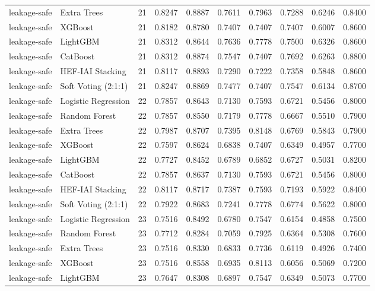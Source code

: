 \begin{tabular}{llrrrrrrrr}
leakage-safe & Extra Trees & 21 & 0.8247 & 0.8887 & 0.7611 & 0.7963 & 0.7288 & 0.6246 & 0.8400 \\
leakage-safe & XGBoost & 21 & 0.8182 & 0.8780 & 0.7407 & 0.7407 & 0.7407 & 0.6007 & 0.8600 \\
leakage-safe & LightGBM & 21 & 0.8312 & 0.8644 & 0.7636 & 0.7778 & 0.7500 & 0.6326 & 0.8600 \\
leakage-safe & CatBoost & 21 & 0.8312 & 0.8874 & 0.7547 & 0.7407 & 0.7692 & 0.6263 & 0.8800 \\
leakage-safe & HEF-IAI Stacking & 21 & 0.8117 & 0.8893 & 0.7290 & 0.7222 & 0.7358 & 0.5848 & 0.8600 \\
leakage-safe & Soft Voting (2:1:1) & 21 & 0.8247 & 0.8869 & 0.7477 & 0.7407 & 0.7547 & 0.6134 & 0.8700 \\
leakage-safe & Logistic Regression & 22 & 0.7857 & 0.8643 & 0.7130 & 0.7593 & 0.6721 & 0.5456 & 0.8000 \\
leakage-safe & Random Forest & 22 & 0.7857 & 0.8550 & 0.7179 & 0.7778 & 0.6667 & 0.5510 & 0.7900 \\
leakage-safe & Extra Trees & 22 & 0.7987 & 0.8707 & 0.7395 & 0.8148 & 0.6769 & 0.5843 & 0.7900 \\
leakage-safe & XGBoost & 22 & 0.7597 & 0.8624 & 0.6838 & 0.7407 & 0.6349 & 0.4957 & 0.7700 \\
leakage-safe & LightGBM & 22 & 0.7727 & 0.8452 & 0.6789 & 0.6852 & 0.6727 & 0.5031 & 0.8200 \\
leakage-safe & CatBoost & 22 & 0.7857 & 0.8637 & 0.7130 & 0.7593 & 0.6721 & 0.5456 & 0.8000 \\
leakage-safe & HEF-IAI Stacking & 22 & 0.8117 & 0.8717 & 0.7387 & 0.7593 & 0.7193 & 0.5922 & 0.8400 \\
leakage-safe & Soft Voting (2:1:1) & 22 & 0.7922 & 0.8683 & 0.7241 & 0.7778 & 0.6774 & 0.5622 & 0.8000 \\
leakage-safe & Logistic Regression & 23 & 0.7516 & 0.8492 & 0.6780 & 0.7547 & 0.6154 & 0.4858 & 0.7500 \\
leakage-safe & Random Forest & 23 & 0.7712 & 0.8284 & 0.7059 & 0.7925 & 0.6364 & 0.5308 & 0.7600 \\
leakage-safe & Extra Trees & 23 & 0.7516 & 0.8330 & 0.6833 & 0.7736 & 0.6119 & 0.4926 & 0.7400 \\
leakage-safe & XGBoost & 23 & 0.7516 & 0.8558 & 0.6935 & 0.8113 & 0.6056 & 0.5069 & 0.7200 \\
leakage-safe & LightGBM & 23 & 0.7647 & 0.8308 & 0.6897 & 0.7547 & 0.6349 & 0.5073 & 0.7700 \\

\end{tabular}
